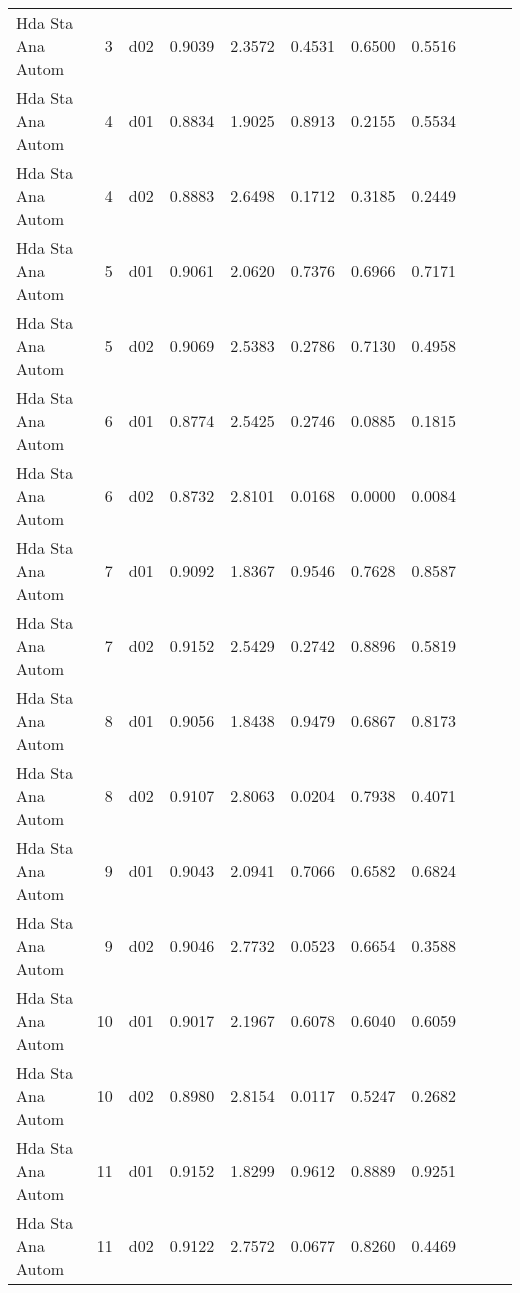 \begin{landscape}
\begin{longtable}{p{2cm}rrrrrrrrrr}
       Hda Sta Ana Autom  &          3 &     d02 &   0.9039 &  2.3572 &        0.4531 &           0.6500 &  0.5516 \\
       Hda Sta Ana Autom  &          4 &     d01 &   0.8834 &  1.9025 &        0.8913 &           0.2155 &  0.5534 \\
       Hda Sta Ana Autom  &          4 &     d02 &   0.8883 &  2.6498 &        0.1712 &           0.3185 &  0.2449 \\
       Hda Sta Ana Autom  &          5 &     d01 &   0.9061 &  2.0620 &        0.7376 &           0.6966 &  0.7171 \\
       Hda Sta Ana Autom  &          5 &     d02 &   0.9069 &  2.5383 &        0.2786 &           0.7130 &  0.4958 \\
       Hda Sta Ana Autom  &          6 &     d01 &   0.8774 &  2.5425 &        0.2746 &           0.0885 &  0.1815 \\
       Hda Sta Ana Autom  &          6 &     d02 &   0.8732 &  2.8101 &        0.0168 &           0.0000 &  0.0084 \\
       Hda Sta Ana Autom  &          7 &     d01 &   0.9092 &  1.8367 &        0.9546 &           0.7628 &  0.8587 \\
       Hda Sta Ana Autom  &          7 &     d02 &   0.9152 &  2.5429 &        0.2742 &           0.8896 &  0.5819 \\
       Hda Sta Ana Autom  &          8 &     d01 &   0.9056 &  1.8438 &        0.9479 &           0.6867 &  0.8173 \\
       Hda Sta Ana Autom  &          8 &     d02 &   0.9107 &  2.8063 &        0.0204 &           0.7938 &  0.4071 \\
       Hda Sta Ana Autom  &          9 &     d01 &   0.9043 &  2.0941 &        0.7066 &           0.6582 &  0.6824 \\
       Hda Sta Ana Autom  &          9 &     d02 &   0.9046 &  2.7732 &        0.0523 &           0.6654 &  0.3588 \\
       Hda Sta Ana Autom  &         10 &     d01 &   0.9017 &  2.1967 &        0.6078 &           0.6040 &  0.6059 \\
       Hda Sta Ana Autom  &         10 &     d02 &   0.8980 &  2.8154 &        0.0117 &           0.5247 &  0.2682 \\
       Hda Sta Ana Autom  &         11 &     d01 &   0.9152 &  1.8299 &        0.9612 &           0.8889 &  0.9251 \\
       Hda Sta Ana Autom  &         11 &     d02 &   0.9122 &  2.7572 &        0.0677 &           0.8260 &  0.4469 \\

\end{longtable}
\end{landscape}
